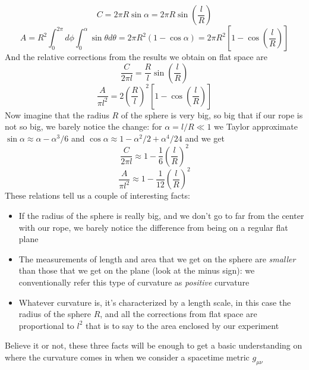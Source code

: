 \documentclass[11pt, a4paper,oneside,openright]{book}
\numberwithin{equation}{section}
\begin{document}
\begin{equation}
C=2\pi R\sin{\alpha}=2\pi R\sin{\left(\frac{l}{R}\right)}
\end{equation}
\begin{equation}
A=R^2\int_0^{2\pi}d\phi\int_0^{\alpha}\sin{\theta}d\theta=2\pi R^2(1-\cos{\alpha})=2\pi R^2\left[1-\cos{\left(\frac{l}{R}\right)}\right]
\end{equation}
And the relative corrections from the results we obtain on flat space are
\begin{equation}
\frac{C}{2\pi l}=\frac{R}{l}\sin{\left(\frac{l}{R}\right)}
\end{equation} 
\begin{equation}
\frac{A}{\pi l^2}=2\left(\frac{R}{l}\right)^2\left[1-\cos{\left(\frac{l}{R}\right)}\right]
\end{equation}
Now imagine that the radius $R$ of the sphere is very big, so big that if our rope is not so big, we barely notice the change: for $\alpha=l/R\ll 1$ we Taylor approximate $\sin{\alpha}\approx \alpha - \alpha^3/6$ and $\cos{\alpha}\approx1-\alpha^2/2+\alpha^4/24$ and we get 
\begin{equation}
\frac{C}{2\pi l}\approx 1-\frac{1}{6}\left(\frac{l}{R}\right)^2
\end{equation}
\begin{equation}
\frac{A}{\pi l^2}\approx 1-\frac{1}{12}\left(\frac{l}{R}\right)^2
\end{equation}
These relations tell us a couple of interesting facts:
\begin{itemize}
\item If the radius of the sphere is really big, and we don't go to far from the center with our rope, we barely notice the difference from being on a regular flat plane
\item The measurements of length and area that we get on the sphere are \textit{smaller} than those that we get on the plane (look at the minus sign): we conventionally refer this type of curvature as \textit{positive} curvature
\item Whatever curvature is, it's characterized by a length scale, in this case the radius of the sphere $R$, and all the corrections from flat space are proportional to $l^2$ that is to say to the area enclosed by our experiment
\end{itemize}
Believe it or not, these three facts will be enough to get a basic understanding on where the curvature comes in when we consider a spacetime metric $g_{\mu\nu}$ 
\end{document}
